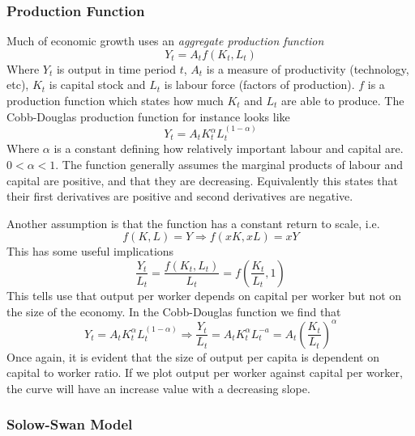 \documentclass[12pt]{report}
\begin{document}
\begin{flushleft}
\subsubsection*{Production Function}

Much of economic growth uses an \textit{aggregate production function}
\[Y_t = A_tf(K_t, L_t)\]
Where \(Y_t\) is output in time period \(t\), \(A_t\) is a measure of
productivity (technology, etc), \(K_t\) is capital stock and \(L_t\) is labour
force (factors of production). \(f\) is a production function which states
how much \(K_t\) and \(L_t\) are able to produce. The Cobb-Douglas production
function for instance looks like
\[Y_t = A_tK_t^\alpha L_t^{(1 - \alpha)}\]
Where \(\alpha\) is a constant defining how relatively important labour and
capital are. \(0 < \alpha < 1\). The function generally assumes the marginal
products of labour and capital are positive, and that they are decreasing.
Equivalently this states that their first derivatives are positive and second
derivatives are negative. \par
Another assumption is that the function has a constant return to scale, i.e.
\[f(K, L) = Y \Rightarrow f(xK, xL) = xY\]
This has some useful implications
\[\frac{Y_t}{L_t} = \frac{f(K_t, L_t)}{L_t} 
= f\left(\frac{K_t}{L_t}, 1\right)\]
This tells use that output per worker depends on capital per worker but not on
the size of the economy. In the Cobb-Douglas function we find that
\[Y_t = A_tK_t^\alpha L_t^{(1 - \alpha)} \Rightarrow \frac{Y_t}{L_t} 
= A_tK_t^\alpha L_t^{-a} = A_t\left(\frac{K_t}{L_t}\right)^\alpha\]
Once again, it is evident that the size of output per capita is dependent on
capital to worker ratio. If we plot output per worker against capital per
worker, the curve will have an increase value with a decreasing slope.

\subsubsection*{Solow-Swan Model}


\end{flushleft}
\end{document}

